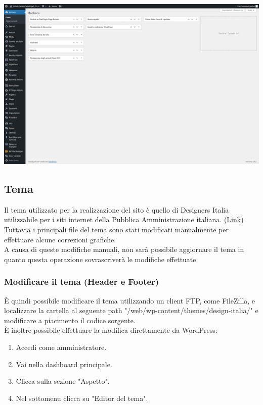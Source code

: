 \documentclass{article}
\begin{document}
	\vspace{0.5 cm}

	\includegraphics[scale=0.18]{Dashboard Wordpress.jpeg}

	\subsection{\textbf{Tema}}
	Il tema utilizzato per la realizzazione del sito è quello di Designers Italia utilizzabile per i siti internet della Pubblica Amministrazione italiana. (\href{https://github.com/italia/design-wordpress-theme}{Link})\\
	Tuttavia i principali file del tema sono stati modificati manualmente per effettuare alcune correzioni grafiche.\\
	A causa di queste modifiche manuali, non sarà possibile aggiornare il tema in quanto questa operazione sovrascriverà le modifiche effettuate.

	\subsubsection{\textbf{Modificare il tema (Header e Footer)}}
	È quindi possibile modificare il tema utilizzando un client FTP, come FileZilla, e localizzare la cartella al seguente path "/web/wp-content/themes/design-italia/" e modificare a piacimento il codice sorgente.\\
	È inoltre possibile effettuare la modifica direttamente da WordPress:

	\begin{enumerate}
		\item Accedi come amministratore.
		\item Vai nella dashboard principale.
		\item Clicca sulla sezione "Aspetto".
		\item Nel sottomenu clicca su "Editor del tema".
	\end{enumerate}
\end{document}
